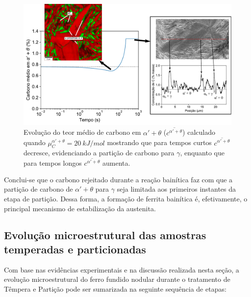\begin{figure}
  \includegraphics[width=\textwidth]{img/cpartition/coupled_cavg_mu20e3.pdf}
  \caption{Evolução do teor médio de carbono em $\alpha' + \theta$ ($\overline{c^{\alpha' + \theta}}$) calculado quando $\mu_C^{\alpha'+\theta} = \SI{20}{kJ/mol}$ mostrando que para tempos curtos $\overline{c^{\alpha' + \theta}}$ decresce, evidenciando a partição de carbono para $\gamma$, enquanto que para tempos longos $\overline{c^{\alpha' + \theta}}$ aumenta.}
  \label{fig:discussao_particao}
\end{figure}

Conclui-se que o carbono rejeitado durante a reação bainítica faz com que a partição de carbono de $\alpha' + \theta$ para $\gamma$ seja limitada aos primeiros instantes da etapa de partição. Dessa forma, a formação de ferrita bainítica é, efetivamente, o principal mecanismo de estabilização da austenita.

\subsection{Evolução microestrutural das amostras temperadas e particionadas}

Com base nas evidências experimentais e na discussão realizada nesta seção, a evolução microestrutural do ferro fundido nodular durante o tratamento de Têmpera e Partição pode ser sumarizada na seguinte sequência de etapas:

